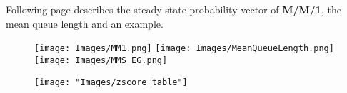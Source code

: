 \documentclass[10pt,a4paper]{article}
\begin{document}
Following page describes the steady state probability vector of \textbf{M/M/1}, the mean queue length and an example.
\newpage 
\begin{figure}[ht] 
\texttt{[image: Images/MM1.png]} 
\texttt{[image: Images/MeanQueueLength.png]} 
\texttt{[image: Images/MMS\_EG.png]} 
\end{figure}
\begin{figure}[ht]
                \centering
                \texttt{[image: "Images/zscore\_table"]}
\end{figure}  		      	
\end{document}
